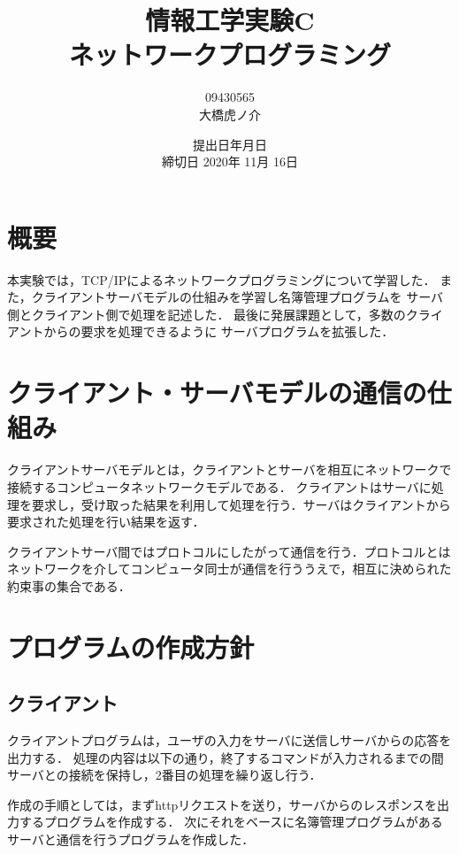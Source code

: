 \documentclass[11pt]{jarticle}
\begin{document}
\title{情報工学実験C\\ネットワークプログラミング}
\author{09430565\\大橋虎ノ介}
\date{提出日\number\year 年\number\month 月\number\day 日\\
締切日 2020年 11月 16日}

\maketitle
\newpage

\section{概要}

本実験では，TCP/IPによるネットワークプログラミングについて学習した．
また，クライアントサーバモデルの仕組みを学習し名簿管理プログラムを
サーバ側とクライアント側で処理を記述した．
最後に発展課題として，多数のクライアントからの要求を処理できるように
サーバプログラムを拡張した．

\section{クライアント・サーバモデルの通信の仕組み}

クライアントサーバモデルとは，クライアントとサーバを相互にネットワークで接続するコンピュータネットワークモデルである．
クライアントはサーバに処理を要求し，受け取った結果を利用して処理を行う．サーバはクライアントから要求された処理を行い結果を返す．

クライアントサーバ間ではプロトコルにしたがって通信を行う．プロトコルとはネットワークを介してコンピュータ同士が通信を行ううえで，相互に決められた約束事の集合である．

\section{プログラムの作成方針}\label{sec:policy}

\subsection{クライアント}

クライアントプログラムは，ユーザの入力をサーバに送信しサーバからの応答を出力する．
処理の内容は以下の通り，終了するコマンドが入力されるまでの間サーバとの接続を保持し，2番目の処理を繰り返し行う．

作成の手順としては，まずhttpリクエストを送り，サーバからのレスポンスを出力するプログラムを作成する．
次にそれをベースに名簿管理プログラムがあるサーバと通信を行うプログラムを作成した．
\end{document}
